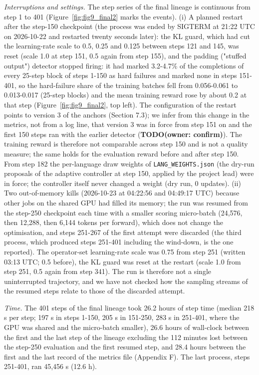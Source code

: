 \emph{Interruptions and settings.} The step series of the final lineage is continuous from step 1 to 401 (Figure~\ref{fig:fig9_final2} marks the events). (i) A planned restart after the step-150 checkpoint (the process was ended by SIGTERM at 21:22 UTC on 2026-10-22 and restarted twenty seconds later): the KL guard, which had cut the learning-rate scale to 0.5, 0.25 and 0.125 between steps 121 and 145, was reset (scale 1.0 at step 151, 0.5 again from step 155), and the padding ("stuffed output") detector stopped firing: it had marked 3.2-4.7\% of the completions of every 25-step block of steps 1-150 as hard failures and marked none in steps 151-401, so the hard-failure share of the training batches fell from 0.056-0.061 to 0.013-0.017 (25-step blocks) and the mean training reward rose by about 0.2 at that step (Figure~\ref{fig:fig9_final2}, top left). The configuration of the restart points to version 3 of the anchors (Section 7.3); we infer from this change in the metrics, not from a log line, that version 3 was in force from step 151 on and the first 150 steps ran with the earlier detector ({\color{red}\textbf{TODO(owner: confirm)}}). The training reward is therefore not comparable across step 150 and is not a quality measure; the same holds for the evaluation reward before and after step 150. From step 182 the per-language draw weights of \texttt{LANG\_WEIGHTS.json} (the dry-run proposals of the adaptive controller at step 150, applied by the project lead) were in force; the controller itself never changed a weight (dry run, 0 updates). (ii) Two out-of-memory kills (2026-10-23 at 04:22:56 and 04:49:17 UTC) because other jobs on the shared GPU had filled its memory; the run was resumed from the step-250 checkpoint each time with a smaller scoring micro-batch (24,576, then 12,288, then 6,144 tokens per forward), which does not change the optimisation, and steps 251-267 of the first attempt were discarded (the third process, which produced steps 251-401 including the wind-down, is the one reported). The operator-set learning-rate scale was 0.75 from step 251 (written 03:13 UTC; 0.5 before), the KL guard was reset at the restart (scale 1.0 from step 251, 0.5 again from step 341). The run is therefore not a single uninterrupted trajectory, and we have not checked how the sampling streams of the resumed steps relate to those of the discarded attempt.

\emph{Time.} The 401 steps of the final lineage took 26.2 hours of step time (median 218 s per step; 197 s in steps 1-150, 205 s in 151-250, 283 s in 251-401, where the GPU was shared and the micro-batch smaller), 26.6 hours of wall-clock between the first and the last step of the lineage excluding the 112 minutes lost between the step-250 evaluation and the first resumed step, and 28.4 hours between the first and the last record of the metrics file (Appendix F). The last process, steps 251-401, ran 45,456 s (12.6 h).

